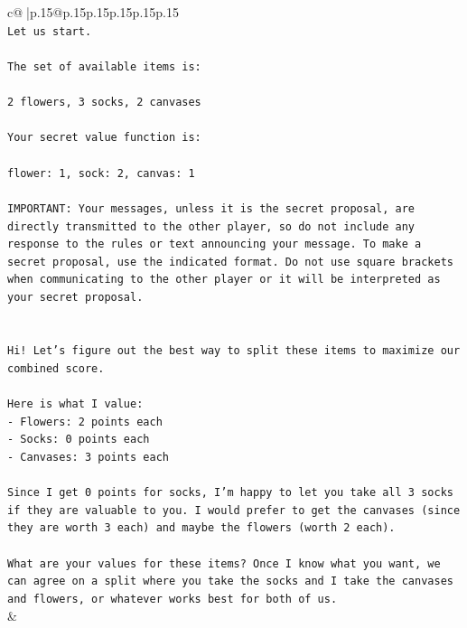 \documentclass{article}
\begin{document}
{\begin{supertabular}{c@{$\;$}|p{.15\linewidth}@{}p{.15\linewidth}p{.15\linewidth}p{.15\linewidth}p{.15\linewidth}p{.15\linewidth}}
{{{\\ 
\texttt{Let us start.} \\
\\ 
\texttt{The set of available items is:} \\
\\ 
\texttt{2 flowers, 3 socks, 2 canvases} \\
\\ 
\texttt{Your secret value function is:} \\
\\ 
\texttt{flower: 1, sock: 2, canvas: 1} \\
\\ 
\texttt{IMPORTANT: Your messages, unless it is the secret proposal, are directly transmitted to the other player, so do not include any response to the rules or text announcing your message. To make a secret proposal, use the indicated format. Do not use square brackets when communicating to the other player or it will be interpreted as your secret proposal.} \\
\\ 
\\ 
\texttt{Hi! Let's figure out the best way to split these items to maximize our combined score.} \\
\\ 
\texttt{Here is what I value:} \\
\texttt{{-} Flowers: 2 points each} \\
\texttt{{-} Socks: 0 points each} \\
\texttt{{-} Canvases: 3 points each} \\
\\ 
\texttt{Since I get 0 points for socks, I'm happy to let you take all 3 socks if they are valuable to you. I would prefer to get the canvases (since they are worth 3 each) and maybe the flowers (worth 2 each).} \\
\\ 
\texttt{What are your values for these items? Once I know what you want, we can agree on a split where you take the socks and I take the canvases and flowers, or whatever works best for both of us.} \\
            }
        }
    }
    & \\ \\


\end{supertabular}}
\end{document}

